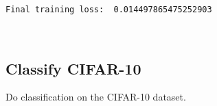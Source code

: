 \documentclass[11pt]{article}
\begin{document}
    \begin{Verbatim}[commandchars=\\\{\}]
Final training loss:  0.014497865475252903

    \end{Verbatim}

    \begin{center}
    \end{center}
    { \hspace*{\fill} \\}
    
    \hypertarget{classify-cifar-10}{%
\subsection{Classify CIFAR-10}\label{classify-cifar-10}}

Do classification on the CIFAR-10 dataset.
\end{document}
